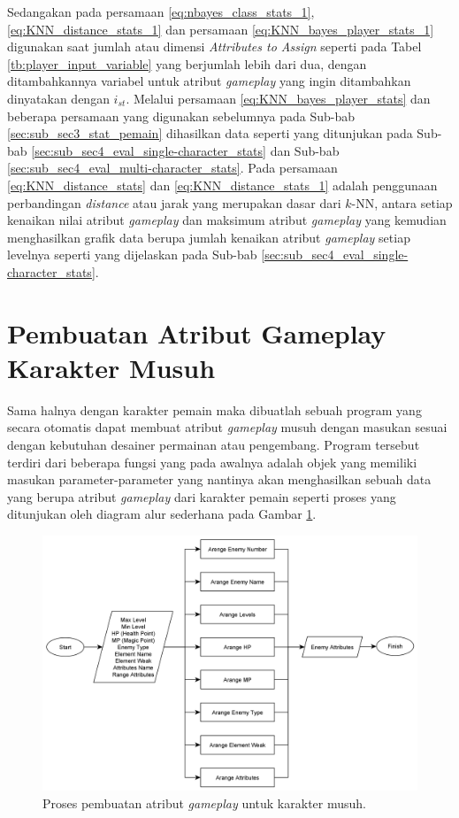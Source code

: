 Sedangakan pada persamaan \ref{eq:nbayes_class_stats_1}, \ref{eq:KNN_distance_stats_1} dan persamaan \ref{eq:KNN_bayes_player_stats_1} digunakan saat jumlah atau dimensi \textit{Attributes to Assign} seperti pada Tabel \ref{tb:player_input_variable} yang berjumlah lebih dari dua, dengan ditambahkannya variabel untuk atribut \textit{gameplay} yang ingin ditambahkan dinyatakan dengan $i_{st}$. Melalui persamaan \ref{eq:KNN_bayes_player_stats} dan beberapa persamaan yang digunakan sebelumnya pada Sub-bab \ref{sec:sub_sec3_stat_pemain} dihasilkan data seperti yang ditunjukan pada Sub-bab \ref{sec:sub_sec4_eval_single-character_stats} dan Sub-bab \ref{sec:sub_sec4_eval_multi-character_stats}. Pada persamaan \ref{eq:KNN_distance_stats} dan \ref{eq:KNN_distance_stats_1} adalah penggunaan perbandingan \textit{distance} atau jarak yang merupakan dasar dari $k$-NN, antara setiap kenaikan nilai atribut \textit{gameplay} dan maksimum atribut \textit{gameplay} yang kemudian menghasilkan grafik data berupa jumlah kenaikan atribut \textit{gameplay} setiap levelnya seperti yang dijelaskan pada Sub-bab \ref{sec:sub_sec4_eval_single-character_stats}.
\vspace{1ex}

\section{Pembuatan Atribut Gameplay Karakter Musuh}
\label{sec:sec3_enemy_stats}
\vspace{1ex}

Sama halnya dengan karakter pemain maka dibuatlah sebuah program yang secara otomatis dapat membuat atribut \textit{gameplay} musuh dengan masukan sesuai dengan kebutuhan desainer permainan atau pengembang. Program tersebut terdiri dari beberapa fungsi yang pada awalnya adalah objek yang memiliki masukan parameter-parameter yang nantinya akan menghasilkan sebuah data yang berupa atribut \textit{gameplay} dari karakter pemain seperti proses yang ditunjukan oleh diagram alur sederhana pada Gambar \ref{fig:enemy_stats_generator}.
\vspace{1ex}

\begin{figure} [!h] \centering
	\includegraphics[scale=0.13]{img/enemy_stats_generator.png}
	\caption{Proses pembuatan atribut \textit{gameplay} untuk karakter musuh.}
	\label{fig:enemy_stats_generator}
\end{figure}

